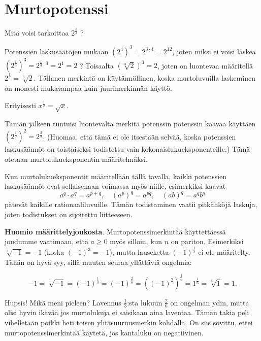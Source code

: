 \chapter{Murtopotenssi}

Mitä voisi tarkoittaa $2^\frac{1}{3}$ ?

Potenssien laskusäätöjen mukaan $(2^4)^3 = 2^{3\cdot 4} = 2^{12}$, joten miksi ei voisi laskea $\left( 2^{\frac{1}{3}}\right)^3 = 2^{\frac{1}{3}\cdot 3} = 2^1=2$ ? Toisaalta $(\sqrt[3]{2})^3=2$, joten on luontevaa määritellä $2^{\frac{1}{3}} = \sqrt[3]{2}$. Tällanen merkintä on käytännöllinen, koska murtoluvuilla laskeminen on monesti mukavampaa kuin juurimerkinnän käyttö.


Erityisesti $x^\frac{1}{2}=\sqrt{x}$.

Tämän jälkeen tuntuisi luontevalta merkitä potenssin potenssin kaavaa käyttäen $(2^{\frac{1}{3}})^2 = 2^{\frac{2}{3}}.$ (Huomaa, että tämä ei ole itsestään selvää, koska potenssien laskusäännöt on toistaiseksi todistettu vain kokonaislukueksponenteille.) Tämä otetaan murtolukueksponentin määritelmäksi.


Kun murtolukueksponentit määritellään tällä tavalla, kaikki potenssien
laskusäännöt ovat sellaisenaan voimassa myös niille, esimerkiksi kaavat
\[ a^q\cdot a^q = a^{p+q}, \quad (a^p)^q = a^{pq}, \quad (ab)^q=a^qb^q \]
pätevät kaikille rationaaliluvuille. Tämän todistaminen vaatii pitkähköjä
laskuja, joten todistukset on sijoitettu liitteeseen.

{\bf Huomio määrittelyjoukosta}. Murtopotenssimerkintää käyttettäessä joudumme vaatimaan, että $a\geq 0$ myös silloin, kun $n$ on pariton. Esimerkiksi $\sqrt[3]{-1}=-1$ (koska $(-1)^3=-1$), mutta lauseketta $(-1)^\frac{1}{3}$ ei ole määritelty. Tähän on hyvä syy, sillä muuten seuraa yllättäviä ongelmia:

\[ -1 = \sqrt[3]{-1} = (-1)^\frac{1}{3} = (-1)^\frac{2}{6}
= ((-1)^2)^\frac{1}{6} = 1^\frac{1}{6} = \sqrt[6]{1} = 1. \]

Hupsis! Mikä meni pieleen? Lavennus $\frac{1}{3}$:sta lukuun $\frac{2}{6}$ on ongelman ydin, mutta olisi hyvin ikävää jos murtolukuja ei saisikaan aina laventaa. Tämän takia peli vihelletään poikki
heti toisen yhtäsuuruusmerkin kohdalla. On siis sovittu, ettei
murtopotenssimerkintää käytetä, jos kantaluku on negatiivinen.

